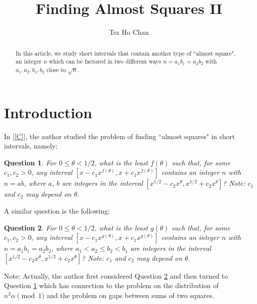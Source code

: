 \documentclass{article}
\title{Finding Almost Squares II}
\author{Tsz Ho Chan}
\newtheorem{question}{Question}
\begin{document}
\maketitle
\begin{abstract}
In this article, we study short intervals that contain another type of ``almost square", an integer $n$ which can be factored in two different ways $n = a_1 b_1 = a_2 b_2$ with $a_1, a_2, b_1, b_2$ close to $\sqrt{n}$.
\end{abstract}
\section{Introduction}
In [\ref{C}], the author studied the problem of finding ``almost squares" in short intervals, namely:
\begin{question}
\label{old}
For $0 \leq \theta < 1/2$, what is the least $f(\theta)$ such
that, for some $c_1, c_2 > 0$, any interval $[x - c_1 x^{f(\theta)}, x
+ c_1 x^{f(\theta)}]$ contains an integer $n$ with $n = ab$, where
$a$, $b$ are integers in the interval $[x^{1/2} - c_2 x^\theta,
x^{1/2} + c_2 x^\theta]$? Note: $c_1$ and $c_2$ may depend on
$\theta$.
\end{question}
A similar question is the following:
\begin{question}
\label{new}
For $0 \leq \theta < 1/2$, what is the least $g(\theta)$ such
that, for some $c_1, c_2 > 0$, any interval $[x - c_1 x^{g(\theta)}, x
+ c_1 x^{g(\theta)}]$ contains an integer $n$ with $n = a_1 b_1 = a_2 b_2$, where
$a_1 < a_2 \leq b_2 < b_1$ are integers in the interval $[x^{1/2} - c_2 x^\theta, x^{1/2} + c_2 x^\theta]$? Note: $c_1$ and $c_2$ may depend on
$\theta$.
\end{question}
Note: Actually, the author first considered Question \ref{new} and then turned to Question \ref{old} which has connection to the problem on the distribution of $n^2 \alpha \pmod 1$ and the problem on gaps between sums of two squares.
\end{document}
